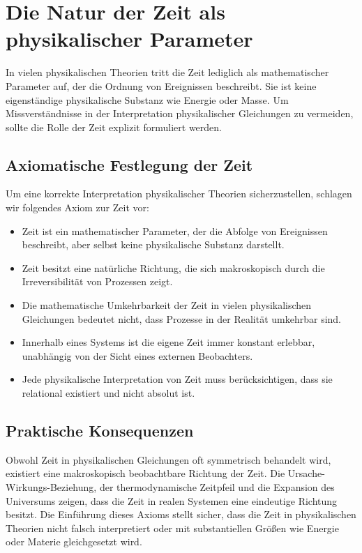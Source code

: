 
\section{Die Natur der Zeit als physikalischer Parameter}

In vielen physikalischen Theorien tritt die Zeit lediglich als mathematischer Parameter auf, der die Ordnung von Ereignissen beschreibt. Sie ist keine eigenständige physikalische Substanz wie Energie oder Masse. Um Missverständnisse in der Interpretation physikalischer Gleichungen zu vermeiden, sollte die Rolle der Zeit explizit formuliert werden.

\subsection{Axiomatische Festlegung der Zeit}

Um eine korrekte Interpretation physikalischer Theorien sicherzustellen, schlagen wir folgendes Axiom zur Zeit vor:

\begin{itemize}
    \item Zeit ist ein mathematischer Parameter, der die Abfolge von Ereignissen beschreibt, aber selbst keine physikalische Substanz darstellt.
    \item Zeit besitzt eine natürliche Richtung, die sich makroskopisch durch die Irreversibilität von Prozessen zeigt.
    \item Die mathematische Umkehrbarkeit der Zeit in vielen physikalischen Gleichungen bedeutet nicht, dass Prozesse in der Realität umkehrbar sind.
    \item Innerhalb eines Systems ist die eigene Zeit immer konstant erlebbar, unabhängig von der Sicht eines externen Beobachters.
    \item Jede physikalische Interpretation von Zeit muss berücksichtigen, dass sie relational existiert und nicht absolut ist.
\end{itemize}

\subsection{Praktische Konsequenzen}

Obwohl Zeit in physikalischen Gleichungen oft symmetrisch behandelt wird, existiert eine makroskopisch beobachtbare Richtung der Zeit. Die Ursache-Wirkungs-Beziehung, der thermodynamische Zeitpfeil und die Expansion des Universums zeigen, dass die Zeit in realen Systemen eine eindeutige Richtung besitzt. Die Einführung dieses Axioms stellt sicher, dass die Zeit in physikalischen Theorien nicht falsch interpretiert oder mit substantiellen Größen wie Energie oder Materie gleichgesetzt wird.


